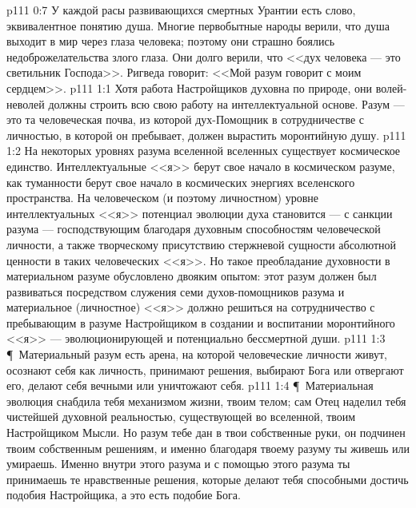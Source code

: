 \vs p111 0:7 У каждой расы развивающихся смертных Урантии есть слово, эквивалентное понятию душа. Многие первобытные народы верили, что душа выходит в мир через глаза человека; поэтому они страшно боялись недоброжелательства злого глаза. Они долго верили, что <<дух человека --- это светильник Господа>>. Ригведа говорит: <<Мой разум говорит с моим сердцем>>.
\vs p111 1:1 Хотя работа Настройщиков духовна по природе, они волей\hyp{}неволей должны строить всю свою работу на интеллектуальной основе. Разум --- это та человеческая почва, из которой дух\hyp{}Помощник в сотрудничестве с личностью, в которой он пребывает, должен вырастить моронтийную душу.
\vs p111 1:2 На некоторых уровнях разума вселенной вселенных существует космическое единство. Интеллектуальные <<я>> берут свое начало в космическом разуме, как туманности берут свое начало в космических энергиях вселенского пространства. На человеческом (и поэтому личностном) уровне интеллектуальных <<я>> потенциал эволюции духа становится --- с санкции разума --- господствующим благодаря духовным способностям человеческой личности, а также творческому присутствию стержневой сущности абсолютной ценности в таких человеческих <<я>>. Но такое преобладание духовности в материальном разуме обусловлено двояким опытом: этот разум должен был развиваться посредством служения семи духов\hyp{}помощников разума и материальное (личностное) <<я>> должно решиться на сотрудничество с пребывающим в разуме Настройщиком в создании и воспитании моронтийного <<я>> --- эволюционирующей и потенциально бессмертной души.
\vs p111 1:3 \P\ Материальный разум есть арена, на которой человеческие личности живут, осознают себя как личность, принимают решения, выбирают Бога или отвергают его, делают себя вечными или уничтожают себя.
\vs p111 1:4 \P\ Материальная эволюция снабдила тебя механизмом жизни, твоим телом; сам Отец наделил тебя чистейшей духовной реальностью, существующей во вселенной, твоим Настройщиком Мысли. Но разум тебе дан в твои собственные руки, он подчинен твоим собственным решениям, и именно благодаря твоему разуму ты живешь или умираешь. Именно внутри этого разума и с помощью этого разума ты принимаешь те нравственные решения, которые делают тебя способными достичь подобия Настройщика, а это есть подобие Бога.
